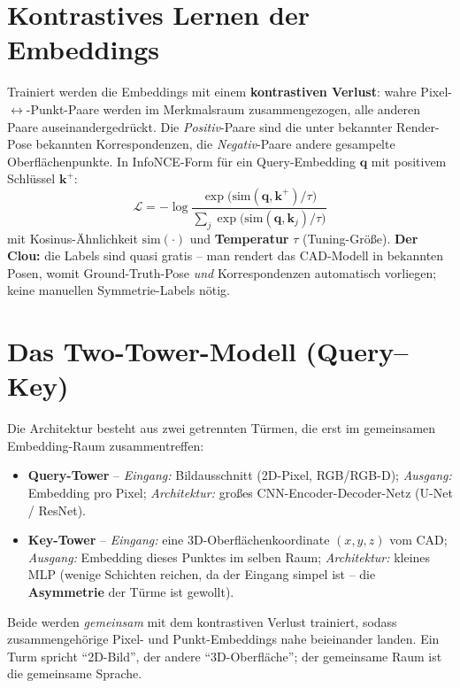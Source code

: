 \section{Kontrastives Lernen der Embeddings}
Trainiert werden die Embeddings mit einem \textbf{kontrastiven Verlust}: wahre
Pixel-$\leftrightarrow$-Punkt-Paare werden im Merkmalsraum zusammengezogen, alle
anderen Paare auseinandergedrückt. Die \emph{Positiv}-Paare sind die unter
bekannter Render-Pose bekannten Korrespondenzen, die \emph{Negativ}-Paare andere
gesampelte Oberflächenpunkte. In InfoNCE-Form für ein Query-Embedding $\bm{q}$
mit positivem Schlüssel $\bm{k}^+$:
\begin{equation}
\mathcal{L} = -\log
\frac{\exp\!\big(\mathrm{sim}(\bm{q},\bm{k}^+)/\tau\big)}
     {\sum_{j}\exp\!\big(\mathrm{sim}(\bm{q},\bm{k}_j)/\tau\big)}
\end{equation}
mit Kosinus-Ähnlichkeit $\mathrm{sim}(\cdot)$ und \textbf{Temperatur} $\tau$
(Tuning-Größe). \textbf{Der Clou:} die Labels sind quasi gratis -- man rendert
das CAD-Modell in bekannten Posen, womit Ground-Truth-Pose \emph{und}
Korrespondenzen automatisch vorliegen; keine manuellen Symmetrie-Labels nötig.

\section{Das Two-Tower-Modell (Query--Key)}
Die Architektur besteht aus zwei getrennten Türmen, die erst im gemeinsamen
Embedding-Raum zusammentreffen:
\begin{itemize}
\item \textbf{Query-Tower} -- \emph{Eingang:} Bildausschnitt (2D-Pixel, RGB/RGB-D);
  \emph{Ausgang:} Embedding pro Pixel; \emph{Architektur:} großes
  CNN-Encoder-Decoder-Netz (U-Net / ResNet).
\item \textbf{Key-Tower} -- \emph{Eingang:} eine 3D-Oberflächenkoordinate
  $(x,y,z)$ vom CAD; \emph{Ausgang:} Embedding dieses Punktes im selben Raum;
  \emph{Architektur:} kleines MLP (wenige Schichten reichen, da der Eingang
  simpel ist -- die \textbf{Asymmetrie} der Türme ist gewollt).
\end{itemize}
Beide werden \emph{gemeinsam} mit dem kontrastiven Verlust trainiert, sodass
zusammengehörige Pixel- und Punkt-Embeddings nahe beieinander landen. Ein Turm
spricht ``2D-Bild'', der andere ``3D-Oberfläche''; der gemeinsame Raum ist die
gemeinsame Sprache.

